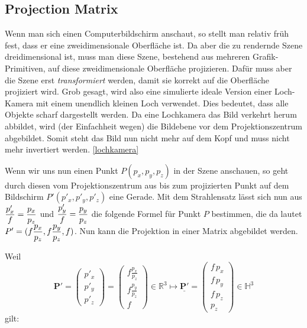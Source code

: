 \subsection{Projection Matrix}
\label{Sec:Projection}
Wenn man sich einen Computerbildschirm anschaut, so stellt man relativ früh fest, dass er eine zweidimensionale Oberfläche ist. 
Da aber die zu rendernde Szene dreidimensional ist, muss man diese Szene, bestehend aus mehreren Grafik-Primitiven, auf diese zweidimensionale Oberfläche projizieren. Dafür muss aber die Szene erst \textit{transformiert} werden, damit sie korrekt auf die Oberfläche projiziert wird. 
Grob gesagt, wird also eine simulierte ideale Version einer Loch-Kamera mit einem unendlich kleinen Loch verwendet. Dies bedeutet, dass alle Objekte scharf dargestellt werden. Da eine Lochkamera das Bild verkehrt herum abbildet, wird (der Einfachheit wegen) die Bildebene vor dem Projektionszentrum abgebildet. Somit steht das Bild nun nicht mehr auf dem Kopf und muss nicht mehr invertiert werden. \cref{lochkamera}

Wenn wir uns nun einen Punkt $P(p_{x}, p_{y}, p_{z})$ in der Szene anschauen, so geht durch diesen vom Projektionszentrum aus bis zum projizierten Punkt auf dem Bildschirm $P'(p'_{x}, p'_{y}, p'_{z})$ eine Gerade. Mit dem Strahlensatz lässt sich nun aus $\dfrac{p'_{x}}{\mathnormal{f}} = \dfrac{p_{x}}{p_{z}} $ und $ \dfrac{p'_{y}}{\mathnormal{f}} = \dfrac{p_{y}}{p_{z}} $ die folgende Formel für Punkt $P$ bestimmen, die da lautet $P'=(\mathnormal{f}\dfrac{p_{x}}{p_{z}}, \mathnormal{f}\dfrac{p_{y}}{p_{z}}, \mathnormal{f})$.
Nun kann die Projektion in einer Matrix abgebildet werden.

Weil $$\mathbf{P'}= \begin{pmatrix} p'_x \\ p'_y \\ p'_z \end{pmatrix}= \begin{pmatrix} f
\frac{p_x}{p_z}\\ f \frac{p_y}{p_z}\\ f \end{pmatrix} \in \mathbb{R}^3 \longmapsto \underline{\mathbf{P'}}= \begin{pmatrix}f \, p_x \\f \, p_y \\ f \, p_z\\
p_z\end{pmatrix} \in \mathbb{H}^3 $$
gilt:	


